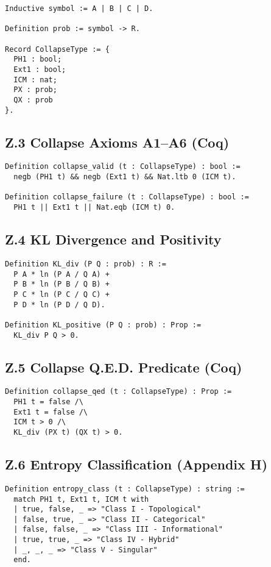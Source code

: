 \documentclass[11pt]{article}
\begin{document}
\begin{lstlisting}
Inductive symbol := A | B | C | D.

Definition prob := symbol -> R.

Record CollapseType := {
  PH1 : bool;
  Ext1 : bool;
  ICM : nat;
  PX : prob;
  QX : prob
}.
\end{lstlisting}

\subsection*{Z.3 Collapse Axioms A1–A6 (Coq)}

\begin{lstlisting}
Definition collapse_valid (t : CollapseType) : bool :=
  negb (PH1 t) && negb (Ext1 t) && Nat.ltb 0 (ICM t).

Definition collapse_failure (t : CollapseType) : bool :=
  PH1 t || Ext1 t || Nat.eqb (ICM t) 0.
\end{lstlisting}

\subsection*{Z.4 KL Divergence and Positivity}

\begin{lstlisting}
Definition KL_div (P Q : prob) : R :=
  P A * ln (P A / Q A) +
  P B * ln (P B / Q B) +
  P C * ln (P C / Q C) +
  P D * ln (P D / Q D).

Definition KL_positive (P Q : prob) : Prop :=
  KL_div P Q > 0.
\end{lstlisting}

\subsection*{Z.5 Collapse Q.E.D. Predicate (Coq)}

\begin{lstlisting}
Definition collapse_qed (t : CollapseType) : Prop :=
  PH1 t = false /\
  Ext1 t = false /\
  ICM t > 0 /\
  KL_div (PX t) (QX t) > 0.
\end{lstlisting}

\subsection*{Z.6 Entropy Classification (Appendix H)}

\begin{lstlisting}
Definition entropy_class (t : CollapseType) : string :=
  match PH1 t, Ext1 t, ICM t with
  | true, false, _ => "Class I - Topological"
  | false, true, _ => "Class II - Categorical"
  | false, false, _ => "Class III - Informational"
  | true, true, _ => "Class IV - Hybrid"
  | _, _, _ => "Class V - Singular"
  end.
\end{lstlisting}
\end{document}
